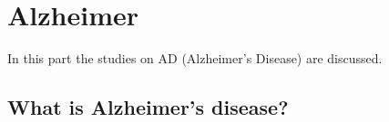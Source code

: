 \section{Alzheimer}

In this part the studies on \gls{AD} (Alzheimer's Disease) are discussed. 

\subsection{What is Alzheimer's disease?}

